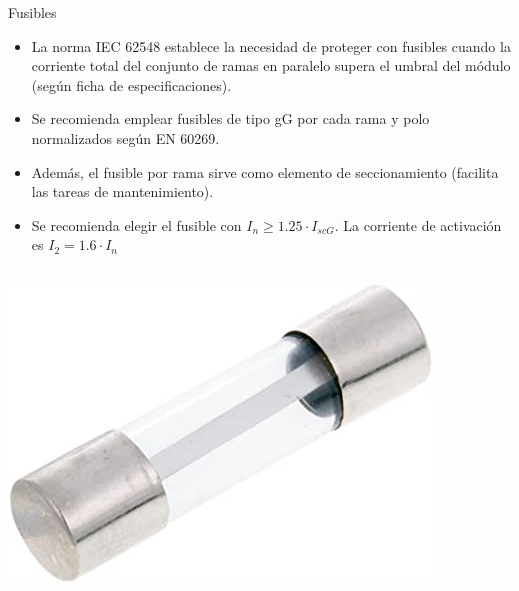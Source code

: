 \documentclass[aspectratio=169, usenames,svgnames,dvipsnames]{beamer}
\begin{document}
\begin{frame}[label={sec:org021f6fe}]{Fusibles}
\begin{itemize}
\item La norma IEC 62548 establece la necesidad de proteger con fusibles
cuando la corriente total del conjunto de ramas en paralelo supera
el umbral del módulo (según ficha de especificaciones).

\item Se recomienda emplear \alert{fusibles} de tipo gG \alert{por cada rama} y polo
normalizados según EN 60269.

\item Además, el fusible por rama sirve como \alert{elemento de seccionamiento}
(facilita las tareas de mantenimiento).

\item Se recomienda elegir el fusible con \(I_{n} \geq 1.25\cdot
  I_{scG}\). La corriente de activación es \(I_{2}=1.6\cdot I_{n}\)
\end{itemize}

\begin{columns}
\begin{column}{0.5\columnwidth}
\begin{center}
\includegraphics[height=0.3\textheight]{../figs/fusible.jpg}
\end{center}
\end{column}



\end{columns}
\end{frame}
\end{document}
